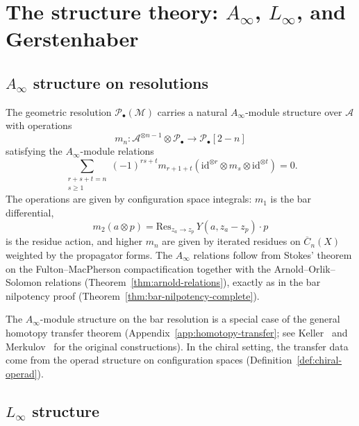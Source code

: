\section{\texorpdfstring{The structure theory: $A_\infty$, $L_\infty$, and Gerstenhaber}{The structure theory: A-infinity, L-infinity, and Gerstenhaber}}

\subsection{\texorpdfstring{$A_\infty$ structure on resolutions}{A-infinity structure on resolutions}}

\begin{theorem}\label{thm:ainfty-module}
The geometric resolution $\mathcal{P}_\bullet(\mathcal{M})$ carries a
natural $A_\infty$-module structure over $\mathcal{A}$ with operations
\[
m_n: \mathcal{A}^{\otimes n-1} \otimes \mathcal{P}_\bullet
\to \mathcal{P}_\bullet[2-n]
\]
satisfying the $A_\infty$-module relations
\[
\sum_{\substack{r+s+t=n \\ s \geq 1}} (-1)^{rs+t}
m_{r+1+t}(\mathrm{id}^{\otimes r} \otimes m_s \otimes \mathrm{id}^{\otimes t}) = 0.
\]
The operations are given by configuration space integrals:
$m_1$ is the bar differential,
\[
m_2(a \otimes p) =
\mathrm{Res}_{z_a \to z_p}\, Y(a, z_a{-}z_p) \cdot p
\]
is the residue action, and higher $m_n$ are given by
iterated residues on $\overline{C}_n(X)$ weighted by the
propagator forms.  The $A_\infty$ relations follow from
Stokes' theorem on the Fulton--MacPherson compactification
together with the Arnold--Orlik--Solomon relations
(Theorem~\ref{thm:arnold-relations}), exactly as in the
bar nilpotency proof (Theorem~\ref{thm:bar-nilpotency-complete}).
\end{theorem}

\begin{remark}
The $A_\infty$-module structure on the bar resolution is a special case
of the general homotopy transfer theorem
(Appendix~\ref{app:homotopy-transfer}; see
Keller~\cite{Keller01} and Merkulov~\cite{Merkulov99} for the
original constructions).  In the chiral setting, the transfer
data come from the operad structure on configuration spaces
(Definition~\ref{def:chiral-operad}).
\end{remark}

\subsection{\texorpdfstring{$L_\infty$ structure}{L-infinity structure}}


